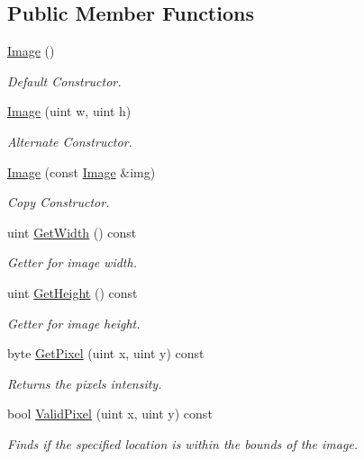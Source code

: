 \subsection*{Public Member Functions}
\begin{DoxyCompactItemize}
\item 
\hyperlink{classimage__processing_1_1Image_abba75f0b2369c4776a5585b5106b5230}{Image} ()
\begin{DoxyCompactList}\small\item\em Default Constructor. \end{DoxyCompactList}\item 
\hyperlink{classimage__processing_1_1Image_af6d00bc8eea560982e2ea61c79a98882}{Image} (uint w, uint h)
\begin{DoxyCompactList}\small\item\em Alternate Constructor. \end{DoxyCompactList}\item 
\hyperlink{classimage__processing_1_1Image_ae0a46daf0a6697343674f4fc1d1a1da6}{Image} (const \hyperlink{classimage__processing_1_1Image}{Image} \&img)
\begin{DoxyCompactList}\small\item\em Copy Constructor. \end{DoxyCompactList}\item 
uint \hyperlink{classimage__processing_1_1Image_a9781426393507ea891a8c2e312317a60}{Get\+Width} () const
\begin{DoxyCompactList}\small\item\em Getter for image width. \end{DoxyCompactList}\item 
uint \hyperlink{classimage__processing_1_1Image_a13ef94cffdbbf778228062afec20795c}{Get\+Height} () const
\begin{DoxyCompactList}\small\item\em Getter for image height. \end{DoxyCompactList}\item 
byte \hyperlink{classimage__processing_1_1Image_a13ca8eb1de2d50b853df8fcb40526eeb}{Get\+Pixel} (uint x, uint y) const
\begin{DoxyCompactList}\small\item\em Returns the pixels intensity. \end{DoxyCompactList}\item 
bool \hyperlink{classimage__processing_1_1Image_a1128997bdc06d00663cefc4059cc5b36}{Valid\+Pixel} (uint x, uint y) const
\begin{DoxyCompactList}\small\item\em Finds if the specified location is within the bounds of the image. \end{DoxyCompactList}\item 

\end{DoxyCompactItemize}
